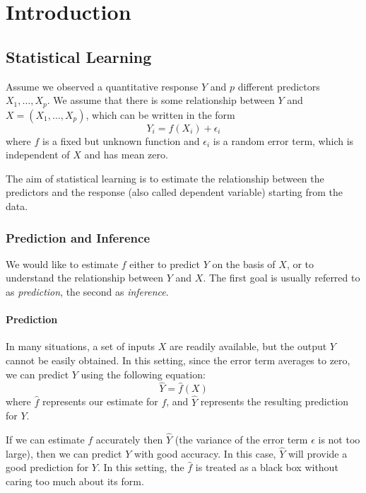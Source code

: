 \chapter*{Introduction}
\markboth{}{}
\section*{Statistical Learning}
Assume we observed a quantitative response $Y$ and $p$ different predictors $X_1,\dots,X_p$. We assume that there is some relationship between $Y$ and $X=(X_1,\dots,X_p)$, which can be written in the form
$$
Y_i=f(X_i)+\epsilon_i
$$
where $f$ is a fixed but unknown function and $\epsilon_i$ is a random error term, which is independent of $X$ and has mean zero.  

The aim of statistical learning is to estimate the relationship between the predictors and the response (also called dependent variable) starting from the data.

\subsection*{Prediction and Inference}

We would like to estimate $f$ either to predict $Y$ on the basis of $X$, or to understand the relationship between $Y$ and $X$. The first goal is usually referred to as \textit{prediction}, the second as \textit{inference}.

\subsubsection*{Prediction}
In many situations, a set of inputs $X$ are readily available, but the output $Y$ cannot be easily obtained. In this setting, since the error term averages to zero, we can predict $Y$ using the following equation:
$$
\hat{Y}=\hat{f}(X)
$$
where $\hat{f}$ represents our estimate for $f$, and $\hat{Y}$ represents the resulting prediction for $Y$.

If we can estimate $f$ accurately then $\hat{Y}$ (the variance of the error term $\epsilon$ is not too large), then we can predict $Y$ with good accuracy. In this case, $\hat{Y}$ will provide a good prediction for $Y$. In this setting, the $\hat{f}$ is treated as a black box without caring too much about its form.

